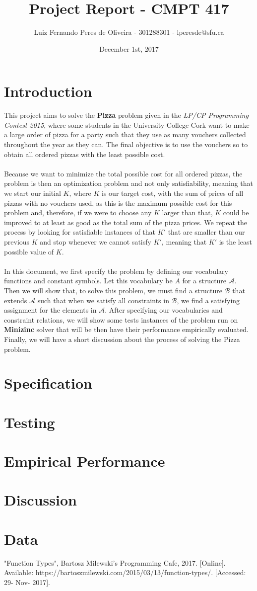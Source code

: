 \documentclass[conference]{IEEEtran}
\title{Project Report - CMPT 417}
\author{Luiz Fernando Peres de Oliveira - 301288301 - lperesde@sfu.ca}
\date{December 1st, 2017}
\newcommand\tab[1][0.3cm]{\hspace*{#1}}
\begin{document}
\maketitle
\section{Introduction}
This project aims to solve the \textbf{Pizza} problem given in the \textit{LP/CP Programming Contest 2015}, where some students in the University College Cork want to make a large order of pizza for a party such that they use as many vouchers collected throughout the year as they can. The final objective is to use the vouchers so to obtain all ordered pizzas with the least possible cost.
\\
\\
\tab Because we want to minimize the total possible cost for all ordered pizzas, the problem is then an optimization problem and not only satisfiability, meaning that we start our initial $K$, where $K$ is our target cost, with the sum of prices of all pizzas with no vouchers used, as this is the maximum possible cost for this problem and, therefore, if we were to choose any $K$ larger than that, $K$ could be improved to at least as good as the total sum of the pizza prices. We repeat the process by looking for satisfiable instances of that $K'$ that are smaller than our previous $K$ and stop whenever we cannot satisfy $K'$, meaning that $K'$ is the least possible value of $K$.
\\
\\
\tab In this document, we first specify the problem by defining our vocabulary functions and constant symbols. Let this vocabulary be $A$ for a structure $\mathcal{A}$. Then we will show that, to solve this problem, we must find a structure $\mathcal{B}$ that extends $\mathcal{A}$ such that when we satisfy all constraints in $\mathcal{B}$, we find a satisfying assignment for the elements in $\mathcal{A}$. After specifying our vocabularies and constraint relations, we will show some tests instances of the problem run on \textbf{Minizinc} solver that will be then have their performance empirically evaluated. Finally, we will have a short discussion about the process of solving the Pizza problem.
\section{Specification}
\section{Testing}
\section{Empirical Performance}
\section{Discussion}
\section{Data}
\begin{thebibliography}{00}
 "Function Types", Bartosz Milewski's Programming Cafe, 2017. [Online]. Available: https://bartoszmilewski.com/2015/03/13/function-types/. [Accessed: 29- Nov- 2017].
\end{thebibliography}
\end{document}
